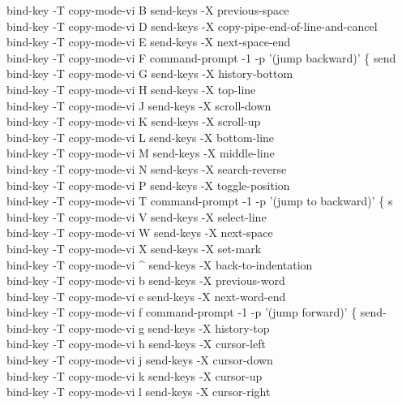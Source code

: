 \documentclass[11pt,a4paper,twoside]{book}
\begin{document}
bind-key  -T copy-mode-vi B  send-keys -X previous-space\\
bind-key  -T copy-mode-vi D  send-keys -X copy-pipe-end-of-line-and-cancel\\
bind-key  -T copy-mode-vi E  send-keys -X next-space-end\\
bind-key  -T copy-mode-vi F  command-prompt -1 -p '(jump backward)' \{ send\\
bind-key  -T copy-mode-vi G  send-keys -X history-bottom\\
bind-key  -T copy-mode-vi H  send-keys -X top-line\\
bind-key  -T copy-mode-vi J  send-keys -X scroll-down\\
bind-key  -T copy-mode-vi K  send-keys -X scroll-up\\
bind-key  -T copy-mode-vi L  send-keys -X bottom-line\\
bind-key  -T copy-mode-vi M  send-keys -X middle-line\\
bind-key  -T copy-mode-vi N  send-keys -X search-reverse\\
bind-key  -T copy-mode-vi P  send-keys -X toggle-position\\
bind-key  -T copy-mode-vi T  command-prompt -1 -p '(jump to backward)' \{ s\\
bind-key  -T copy-mode-vi V  send-keys -X select-line\\
bind-key  -T copy-mode-vi W  send-keys -X next-space\\
bind-key  -T copy-mode-vi X  send-keys -X set-mark\\
bind-key  -T copy-mode-vi \textasciicircum{}  send-keys -X back-to-indentation\\
bind-key  -T copy-mode-vi b  send-keys -X previous-word\\
bind-key  -T copy-mode-vi e  send-keys -X next-word-end\\
bind-key  -T copy-mode-vi f  command-prompt -1 -p '(jump forward)' \{ send-\\
bind-key  -T copy-mode-vi g  send-keys -X history-top\\
bind-key  -T copy-mode-vi h  send-keys -X cursor-left\\
bind-key  -T copy-mode-vi j  send-keys -X cursor-down\\
bind-key  -T copy-mode-vi k  send-keys -X cursor-up\\
bind-key  -T copy-mode-vi l  send-keys -X cursor-right\\


\vspace{16pt}
\end{document}
